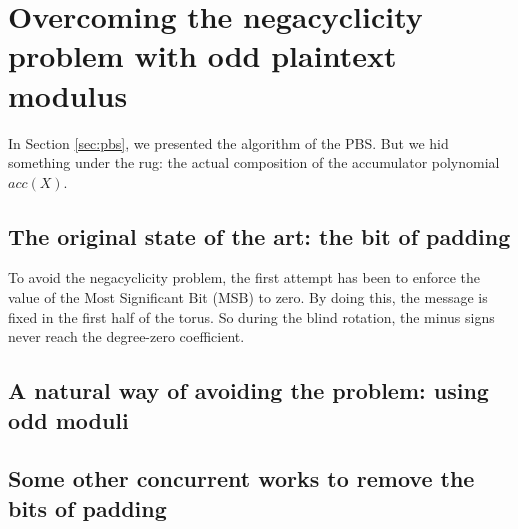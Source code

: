 
\chapter{Overcoming the negacyclicity problem with odd plaintext modulus}
\label{chap:negacyclicity}

In Section \ref{sec:pbs}, we presented the algorithm of the PBS. But we hid something under the rug: the actual composition of the accumulator polynomial $acc(X)$. 


\section{The original state of the art: the bit of padding}

To avoid the negacyclicity problem, the first attempt has been to enforce the value of the Most Significant Bit (MSB) to zero. By doing this, the message is fixed in the first half of the torus. So during the blind rotation, the minus signs never reach the degree-zero coefficient.




\section{A natural way of avoiding the problem: using odd moduli}


\section{Some other concurrent works to remove the bits of padding}





